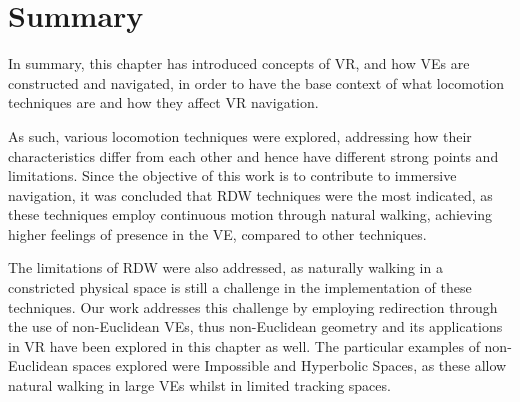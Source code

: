 
 \section{Summary}
\label{sec:summary}

In summary, this chapter has introduced concepts of \gls{VR}, and how \glspl{VE} are constructed and navigated, in order to have the base context 
of what locomotion techniques are and how they affect \gls{VR} navigation. 

As such, various locomotion techniques were explored, addressing how 
their characteristics differ from each other and hence have different strong points and limitations. Since the objective of this work is to 
contribute to immersive navigation, it was concluded that \gls{RDW} techniques were the most indicated, as these techniques employ continuous 
motion through natural walking, achieving higher feelings of presence in the \gls{VE}, compared to other techniques.

The limitations of \gls{RDW} were also addressed, as naturally walking in a constricted physical space is still a challenge in the 
implementation of these techniques. Our work addresses this challenge by employing redirection through the use of non-Euclidean \glspl{VE}, 
thus non-Euclidean geometry and its applications in \gls{VR} have been explored in this chapter as well. The particular examples of 
non-Euclidean spaces explored were Impossible and Hyperbolic Spaces, as these allow natural walking in large \glspl{VE} whilst in limited 
tracking spaces.